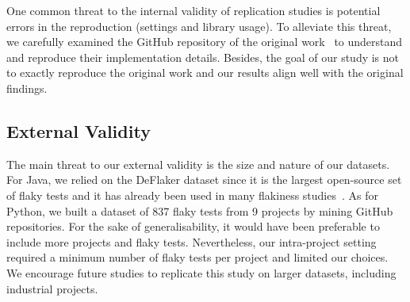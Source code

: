 One common threat to the internal validity of replication studies is potential errors in the reproduction (\eg settings and library usage). 
To alleviate this threat, we carefully examined the GitHub repository of the original work~\cite{damorimR19:online} to understand and reproduce their implementation details. 
Besides, the goal of our study is not to exactly reproduce the original work and our results align well with the original findings.

\subsection{External Validity}
The main threat to our external validity is the size and nature of our datasets.
For Java, we relied on the DeFlaker dataset since it is the largest open-source set of flaky tests and it has already been used in many flakiness studies~\cite{Bertolino2020,Pinto2020}.
As for Python, we built a dataset of 837 flaky tests from 9 projects by mining GitHub repositories.
For the sake of generalisability, it would have been preferable to include more projects and flaky tests.
Nevertheless, our intra-project setting required a minimum number of flaky tests per project and limited our choices.
We encourage future studies to replicate this study on larger datasets, including industrial projects.



